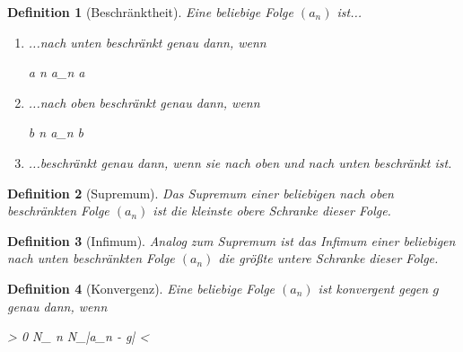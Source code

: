 \documentclass{article}
\newtheorem{defn}{Definition}[section]
\newenvironment{aleq*}{\begin{equation*}\begin{aligned}}{\end{aligned}\end{equation*}}
\begin{document}
	\begin{defn}[Beschränktheit]
		\label{defBeschraenktheit}
		Eine beliebige Folge \((a_n)\) ist...
		\begin{enumerate}
			\item ...nach unten beschränkt genau dann, wenn
			\begin{aleq*}
				\exists a \in {} \colon \forall n \in {} \colon a_n \geq a 
			\end{aleq*}
			\item ...nach oben beschränkt genau dann, wenn
			\begin{aleq*}
				\exists b \in {} \colon \forall n \in {} \colon a_n \leq b \text{.}
			\end{aleq*}
			\item ...beschränkt genau dann, wenn sie nach oben und nach unten beschränkt ist.
		\end{enumerate}
	\end{defn}
	
	\begin{defn}[Supremum]
		\label{defSupremum}
		Das Supremum einer beliebigen nach oben beschränkten Folge \((a_n)\) ist die kleinste obere Schranke dieser Folge.
	\end{defn}
	
	\begin{defn}[Infimum]
		\label{defInfimum}
		Analog zum Supremum ist das Infimum einer beliebigen nach unten beschränkten Folge \((a_n)\) die größte untere Schranke dieser Folge.
	\end{defn}
	
	\begin{defn}[Konvergenz]
		\label{defKonvergenz}
		Eine beliebige Folge \((a_n)\) ist konvergent gegen \(g\) genau dann, wenn
		\begin{aleq*}
			\forall \varepsilon > 0 \colon \exists N_\varepsilon \in {} \colon \forall n \geq N_\varepsilon \colon |a_n - g| < \varepsilon {}
		\end{aleq*}
	\end{defn}
	
\end{document}
